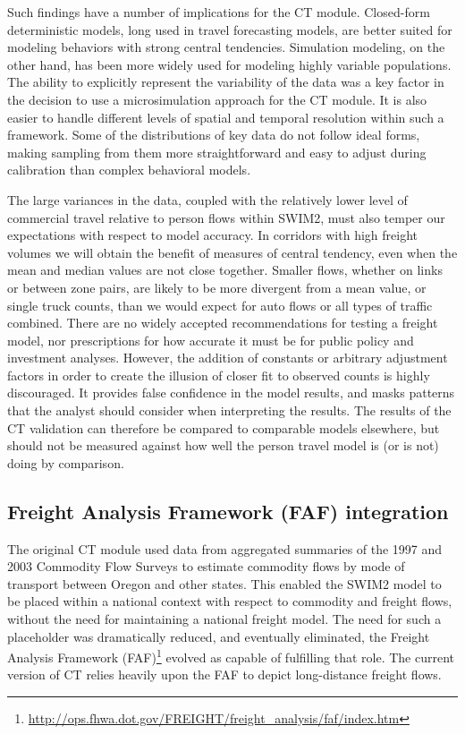 Such findings have a number of implications for the CT module. Closed-form deterministic models, long used in travel forecasting models, are better suited for modeling behaviors with strong central tendencies. Simulation modeling, on the other hand, has been more widely used for modeling highly variable populations. The ability to explicitly represent the variability of the data was a key factor in the decision to use a microsimulation approach for the CT module. It is also easier to handle different levels of spatial and temporal resolution within such a framework. Some of the distributions of key data do not follow ideal forms, making sampling from them more straightforward and easy to adjust during calibration than complex behavioral models.

The large variances in the data, coupled with the relatively lower level of commercial travel relative to person flows within SWIM2, must also temper our expectations with respect to model accuracy. In corridors with high freight volumes we will obtain the benefit of measures of central tendency, even when the mean and median values are not close together. Smaller flows, whether on links or between zone pairs, are likely to be more divergent from a mean value, or single truck counts, than we would expect for auto flows or all types of traffic combined. There are no widely accepted recommendations for testing a freight model, nor prescriptions for how accurate it must be for public policy and investment analyses. However, the addition of constants or arbitrary adjustment factors in order to create the illusion of closer fit to observed counts is highly discouraged. It provides false confidence in the model results, and masks patterns that the analyst should consider when interpreting the results. The results of the CT validation can therefore be compared to comparable models elsewhere, but should not be measured against how well the person travel model is (or is not) doing by comparison.

\subsection{Freight Analysis Framework (FAF) integration}
The original CT module used data from aggregated summaries of the 1997 and 2003 Commodity Flow Surveys to estimate commodity flows by mode of transport between Oregon and other states. This enabled the SWIM2 model to be placed within a national context with respect to commodity and freight flows, without the need for maintaining a national freight model. The need for such a placeholder was dramatically reduced, and eventually eliminated, the Freight Analysis Framework (FAF)\footnote{\url{http://ops.fhwa.dot.gov/FREIGHT/freight_analysis/faf/index.htm}} evolved as capable of fulfilling that role. The current version of CT relies heavily upon the FAF to depict long-distance freight flows.

